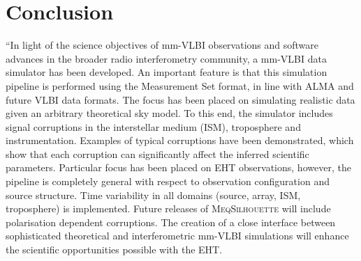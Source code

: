 \chapter{Conclusion}

``In light of the science objectives of mm-VLBI observations and software advances in the broader radio interferometry community, a mm-VLBI data simulator has been developed. An important feature is that this simulation pipeline is performed using the {\sc Measurement Set} format, in line with ALMA and future VLBI data formats. The focus has been placed on simulating realistic data given an arbitrary theoretical sky model. To this end, the simulator includes signal corruptions in the interstellar medium (ISM), troposphere and instrumentation. Examples of typical corruptions have been demonstrated, which show that each corruption can significantly affect the inferred scientific parameters. Particular focus has been placed on EHT observations, however, the pipeline is completely general with respect to observation configuration and source structure. Time variability in all domains (source, array, ISM, troposphere) is implemented.  Future releases of \textsc{MeqSilhouette} will include polarisation dependent corruptions. The creation of a close interface between sophisticated theoretical and interferometric mm-VLBI simulations will enhance the scientific opportunities possible with the EHT.

